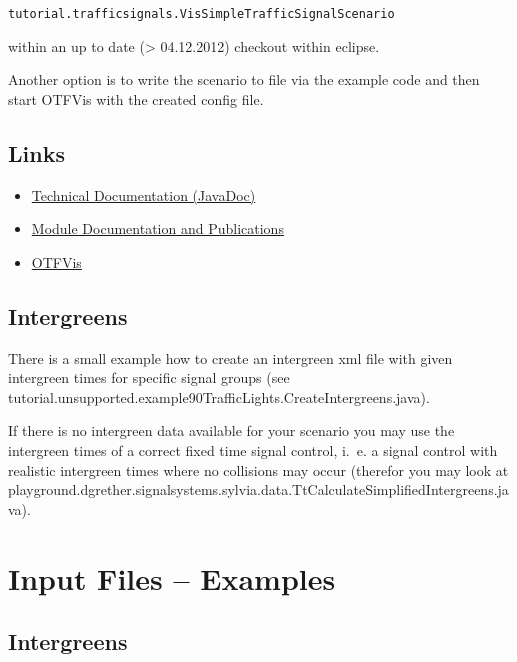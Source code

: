 \texttt{\nolinebreak  tutorial.trafficsignals.VisSimpleTrafficSignalScenario }

within an up to date (> 04.12.2012) checkout within eclipse.

Another option is to write the scenario to file via the example code and then start OTFVis with the created config file.

\subsection{Links}
\begin{itemize}
	\item \href{http://ci.matsim.org:8080/job/MATSim_M2/javadoc/org/matsim/signalsystems/package-summary.html}{Technical Documentation (JavaDoc)}
	\item \href{http://matsim.org/node/384}{Module Documentation and Publications}
	\item \href{http://matsim.org/node/693}{OTFVis}
\end{itemize}

\subsection{Intergreens}

There is a small example how to create an intergreen xml file with given
intergreen times for specific signal groups (see
tutorial.unsupported.example90TrafficLights.CreateIntergreens.java).

If there is no intergreen data available for your scenario you may use the
intergreen times of a correct fixed time signal control, i.~e. a signal control
with realistic intergreen times where no collisions may occur (therefor you may
look at playground.dgrether.signalsystems.sylvia.data.TtCalculateSimplifiedIntergreens.java).

\section{Input Files -- Examples}

\subsection{Intergreens}
\lstset{breaklines=true,language=XML}



\texttt{\nolinebreak  }




\texttt{\nolinebreak  }
